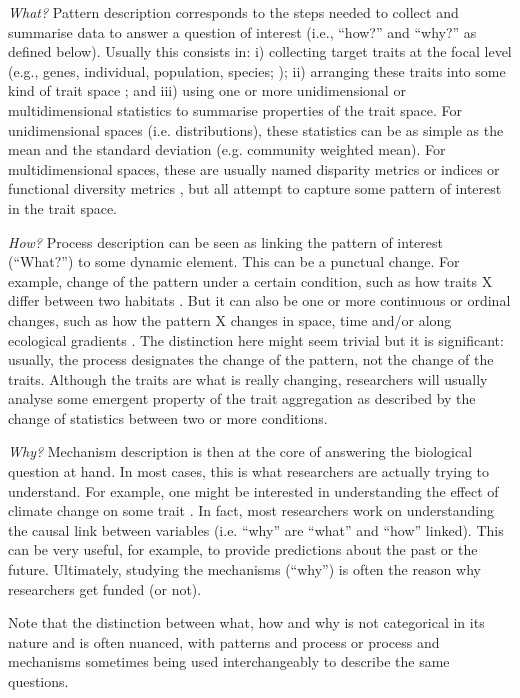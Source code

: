 \documentclass[12pt,letterpaper]{article}
\begin{document}
\textit{What?} Pattern description corresponds to the steps needed to collect and summarise data to answer a question of interest (i.e., ``how?'' and ``why?'' as defined below).
Usually this consists in: i) collecting target traits at the focal level (e.g., genes, individual, population, species; \citealt{violle2007let}); ii) arranging these traits into some kind of trait space \citep{guillerme2020disparities, mammola2021concepts}; and iii) using one or more unidimensional or multidimensional statistics to summarise properties of the trait space.
For unidimensional spaces (i.e. distributions), these statistics can be as simple as the mean and the standard deviation (e.g. community weighted mean).
For multidimensional spaces, these are usually named disparity metrics or indices \citep{guillerme2020disparities} or functional diversity metrics \citep{mammola2021concepts}, but all attempt to capture some pattern of interest in the trait space.

\textit{How?} Process description can be seen as linking the pattern of interest (``What?'') to some dynamic element.
This can be a punctual change.
For example, change of the pattern under a certain condition, such as how traits X differ between two habitats \citep{martinez2021habitat}.
But it can also be one or more continuous or ordinal changes, such as how the pattern X changes in space, time and/or along ecological gradients \citep{belmaker2013spatial, jarzyna2018taxonomic,lamanna2014functional,bjorkman2018plant,mclean2021trait}.
The distinction here might seem trivial but it is significant: usually, the process designates the change of the pattern, not the change of the traits.
Although the traits are what is really changing, researchers will usually analyse some emergent property of the trait aggregation as described by the change of statistics between two or more conditions.

\textit{Why?} Mechanism description is then at the core of answering the biological question at hand.
In most cases, this is what researchers are actually trying to understand.
For example, one might be interested in understanding the effect of climate change on some trait \citep{boonman2022trait}.
In fact, most researchers work on understanding the causal link between variables (i.e. ``why'' are ``what'' and ``how'' linked).
This can be very useful, for example, to provide predictions about the past or the future.
Ultimately, studying the mechanisms (``why'') is often the reason why researchers get funded (or not).

Note that the distinction between what, how and why is not categorical in its nature and is often nuanced, with patterns and process or process and mechanisms sometimes being used interchangeably to describe the same questions.
\end{document}
